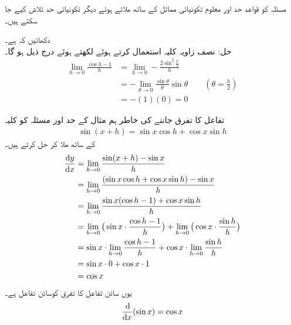 مسئلہ  کو قواعد حد اور معلوم تکونیاتی مماثل کے ساتھ ملاتے ہوئے دیگر تکونیاتی حد تلاش کیے جا سکتے ہیں۔ 

دکھائیں کہ  ہے۔\\
حل:\quad
نصف زاویہ کلیہ استعمال کرتے ہوئے  لکھتے ہوئے درج ذیل ہو گا۔
\begin{align*}
\lim_{h\to 0}\frac{\cos h-1}{h}&=\lim_{h\to 0}-\frac{2\sin^2\tfrac{h}{2}}{h}\\
&=-\lim_{\theta\to 0} \frac{\sin\theta}{\theta}\sin\theta\quad\quad (\theta=\frac{h}{2})\\
&=-(1)(0)=0
\end{align*}

تفاعل  کا تفرق جاننے کی خاطر ہم مثال  کے حد اور  مسئلہ  کو  کلیہ 
\begin{align*}
\sin(x+h)=\sin x\cos h+\cos x\sin h
\end{align*}
کے ساتھ ملا کر حل کرتے ہیں۔
\begin{align*}
\frac{\dif y}{\dif x}&=\lim_{h\to 0}\frac{\sin(x+h)-\sin x}{h}\\
&=\lim_{h\to 0} \frac{(\sin x\cos h+\cos x\sin h)-\sin x}{h}\\
&=\lim_{h\to 0} \frac{\sin x(\cos h-1)+\cos x\sin h}{h}\\
&=\lim_{h\to 0} \big(\sin x\cdot \frac{\cos h-1}{h}\big)+\lim_{h\to 0}\big(\cos x\cdot \frac{\sin h}{h}\big)\\
&=\sin x\cdot \lim_{h\to 0}\frac{\cos h-1}{h}+\cos x\cdot \lim_{h\to 0}\frac{\sin h}{h}\\
&=\sin x\cdot 0+\cos x \cdot 1\\
&=\cos x
\end{align*}
یوں سائن تفاعل کا تفرق کوسائن تفاعل ہے۔
\begin{align*}
\frac{\dif}{\dif x} (\sin x)=\cos x
\end{align*}

